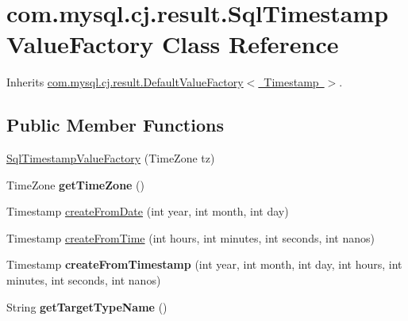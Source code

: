 \hypertarget{classcom_1_1mysql_1_1cj_1_1result_1_1_sql_timestamp_value_factory}{}\section{com.\+mysql.\+cj.\+result.\+Sql\+Timestamp\+Value\+Factory Class Reference}
\label{classcom_1_1mysql_1_1cj_1_1result_1_1_sql_timestamp_value_factory}


Inherits \mbox{\hyperlink{classcom_1_1mysql_1_1cj_1_1result_1_1_default_value_factory}{com.\+mysql.\+cj.\+result.\+Default\+Value\+Factory$<$ Timestamp $>$}}.

\subsection*{Public Member Functions}
\begin{DoxyCompactItemize}
\item 
\mbox{\hyperlink{classcom_1_1mysql_1_1cj_1_1result_1_1_sql_timestamp_value_factory_a443de10f7aa6daa9ecf3e43bcd6d21fb}{Sql\+Timestamp\+Value\+Factory}} (Time\+Zone tz)
\item 
\mbox{\label{classcom_1_1mysql_1_1cj_1_1result_1_1_sql_timestamp_value_factory_a68ae23c7eb1c8944883b854ddf595a77}} 
Time\+Zone {\bfseries get\+Time\+Zone} ()
\item 
Timestamp \mbox{\hyperlink{classcom_1_1mysql_1_1cj_1_1result_1_1_sql_timestamp_value_factory_a87b52f4c2804aead4fd10c776c88295a}{create\+From\+Date}} (int year, int month, int day)
\item 
Timestamp \mbox{\hyperlink{classcom_1_1mysql_1_1cj_1_1result_1_1_sql_timestamp_value_factory_a8fbb0901790f2aa3a7175ba7f1f5727d}{create\+From\+Time}} (int hours, int minutes, int seconds, int nanos)
\item 
\mbox{\label{classcom_1_1mysql_1_1cj_1_1result_1_1_sql_timestamp_value_factory_a78551233e571fb77da40368363d35cca}} 
Timestamp {\bfseries create\+From\+Timestamp} (int year, int month, int day, int hours, int minutes, int seconds, int nanos)
\item 
\mbox{\label{classcom_1_1mysql_1_1cj_1_1result_1_1_sql_timestamp_value_factory_a08bd94d6bde7df9a086111e17b86d60a}} 
String {\bfseries get\+Target\+Type\+Name} ()
\end{DoxyCompactItemize}


